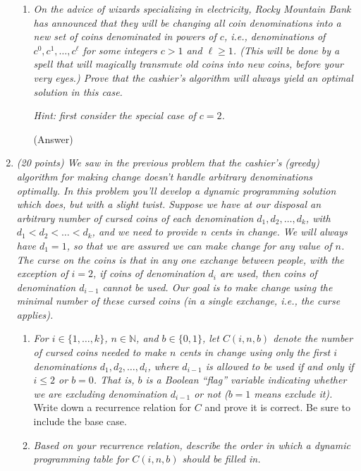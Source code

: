 \documentclass[12pt]{article}
\begin{document}
\begin{enumerate}
\begin{enumerate}
	
	
	\item \textit{ On the advice of wizards specializing in electricity, Rocky Mountain Bank has announced that they will be changing all  coin denominations into a new set of coins denominated in powers of $c$, i.e., denominations of $c^{0}, c^{1}, \dots , c^{\ell}$ for some integers $c>1$ and $\ell\geq 1$.  (This will be done by a spell that will magically transmute old coins into new coins, before your very eyes.) Prove that the cashier's algorithm will always yield an optimal solution in this case.}
	
	\textit{ Hint: first consider the special case of $c=2$.}

(Answer)

	\end{enumerate}
    
\newpage

    \item\textit{  (20 points) We saw in the previous problem that the cashier's (greedy) algorithm for making change doesn't handle arbitrary denominations optimally. In this problem you'll develop a dynamic programming solution which does, but with a slight twist. Suppose we have at our disposal an arbitrary number of \emph{cursed} coins of each denomination $d_1, d_2, \dotsc, d_k$, with $d_1 < d_2 < \dotsc < d_k$, and we need to provide $n$ cents in change. We will always have $d_1=1$, so that we are assured we can make change for any value of $n$. The curse on the coins is that in any one exchange between people, with the exception of $i=2$, if coins of denomination $d_i$ are used, then coins of denomination $d_{i-1}$ \emph{cannot} be used. Our goal is to make change using the minimal number of these cursed coins (in a single exchange, i.e., the curse applies).}

    \begin{enumerate}
    	\item\textit{  For $i \in \{1,\dotsc,k\}$, $n \in \mathbb{N}$, and $b \in \{0,1\}$, let $C(i,n,b)$ denote the number of cursed coins needed to make $n$ cents in change using only the first $i$ denominations $d_1, d_2, \dotsc, d_i$, where $d_{i-1}$ is allowed to be used if and only if $i \leq 2$ or $b=0$. That is, $b$ is a Boolean ``flag'' variable indicating whether we are excluding denomination $d_{i-1}$ or not ($b=1$ means exclude it). 	}
    	Write down a recurrence relation for $C$ and prove it is correct. Be sure to include the base case.
    	\item \textit{ Based on your recurrence relation, describe the order in which a dynamic programming table for $C(i,n,b)$ should be filled in.}
    	

\end{enumerate}
\end{enumerate}
\end{document}
